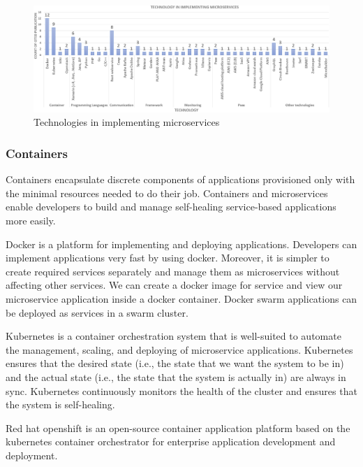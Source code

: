\begin{figure}[t]
	\centering
	\includegraphics[width=\linewidth]{images/commontechupdated.png}
	\caption{Technologies in implementing microservices }
	\label{fig:tech-distinct}
\end{figure}


\subsubsection{Containers}
Containers encapsulate discrete components of applications provisioned only with the minimal resources needed to do their job. Containers and microservices enable developers to build and manage self-healing service-based applications more easily.

Docker is a platform for implementing and deploying applications. Developers can implement applications very fast by using docker.\cite{khan2020, Kristiani2020, Sharaf2019} Moreover, it is simpler to create required services separately and manage them as microservices without affecting other services.\cite{Leo2019, Kalske2017paper, Hou2020, Bahadori2018} We can create a docker image for service and view our microservice application inside a docker container. Docker swarm applications can be deployed as services in a swarm cluster.\cite{Venugopal2017, coulson2020, Falatiuk2019}
	
Kubernetes is a container orchestration system that is well-suited to automate the management, scaling, and deploying of microservice applications.\cite{khan2020, Zaytev2018, Kristiani2020}
Kubernetes ensures that the desired state (i.e., the state that we want the system to be in) and the actual state (i.e., the state that the system is actually in) are always in sync. Kubernetes continuously monitors the health of the cluster and ensures that the system is self-healing.\cite{Venugopal2017, Bahadori2018, Falatiuk2019}

Red hat openshift is an open-source container application platform based on the kubernetes container orchestrator for enterprise application development and deployment.\cite{Johansson2019, Bahadori2018}


